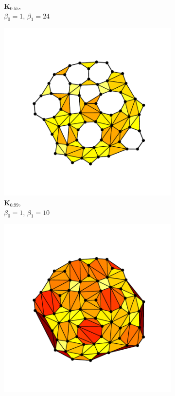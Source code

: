 \begin{figure}[tb]
\begin{subfigure}[b]{0.22\textwidth}
         \caption{$\mathbf{K}_{0.55}$,\\ $\beta_0=1$, $\beta_1=24$}
         \label{fig:phexf}
     \end{subfigure}
       \hfill
      \begin{subfigure}[b]{0.22\textwidth}
         \centering
         \includegraphics[width=\textwidth]{./figures/ph/ph_ex_amorph_20.pdf}
         \caption{$\mathbf{K}_{0.99}$,\\ $\beta_0=1$, $\beta_1=10$}
         \label{fig:phexg}
     \end{subfigure}
       \hfill
      \begin{subfigure}[b]{0.22\textwidth}
         \centering
         \includegraphics[width=\textwidth]{./figures/ph/ph_ex_amorph_inf.pdf}

\end{subfigure}
\end{figure}
